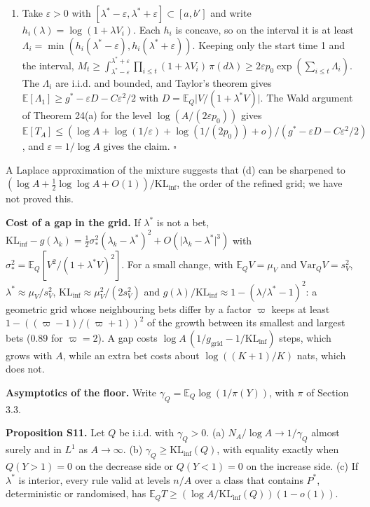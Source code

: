\documentclass[
]{article}
\begin{document}
\begin{enumerate}
  shows that \(K \asymp \sqrt{\log A}\) minimises the second-order term
  of this bound.
\item
  Take \(\varepsilon > 0\) with
  \([\lambda^\ast - \varepsilon, \lambda^\ast + \varepsilon] \subset [a, b']\)
  and write \(h_i(\lambda) = \log(1 + \lambda V_i)\). Each \(h_i\) is
  concave, so on the interval it is at least
  \(\Lambda_i = \min(h_i(\lambda^\ast - \varepsilon), h_i(\lambda^\ast + \varepsilon))\).
  Keeping only the start time 1 and the interval,
  \(M_t \ge \int_{\lambda^\ast - \varepsilon}^{\lambda^\ast + \varepsilon}\prod_{i \le t}(1 + \lambda V_i)\,\pi(d\lambda) \ge 2\varepsilon p_0\exp(\sum_{i \le t}\Lambda_i)\).
  The \(\Lambda_i\) are i.i.d. and bounded, and Taylor's theorem gives
  \(\mathbb{E}[\Lambda_1] \ge g^\ast - \varepsilon D - C\varepsilon^2/2\)
  with \(D = \mathbb{E}_Q\lvert V/(1 + \lambda^\ast V)\rvert\). The Wald
  argument of Theorem 24(a) for the level \(\log(A/(2\varepsilon p_0))\)
  gives
  \(\mathbb{E}[T_A] \le (\log A + \log(1/\varepsilon) + \log(1/(2p_0)) + o)/(g^\ast - \varepsilon D - C\varepsilon^2/2)\),
  and \(\varepsilon = 1/\log A\) gives the claim. \(\square\)
\end{enumerate}

A Laplace approximation of the mixture suggests that (d) can be
sharpened to
\((\log A + \tfrac12\log\log A + O(1))/\mathrm{KL}_{\inf}\), the order
of the refined grid; we have not proved this.

\textbf{Cost of a gap in the grid.} If \(\lambda^\ast\) is not a bet,
\(\mathrm{KL}_{\inf} - g(\lambda_k) = \tfrac12\sigma_\ast^2(\lambda_k - \lambda^\ast)^2 + O(\lvert \lambda_k - \lambda^\ast\rvert^3)\)
with \(\sigma_\ast^2 = \mathbb{E}_Q[V^2/(1 + \lambda^\ast V)^2]\). For a
small change, with \(\mathbb{E}_Q V = \mu_V\) and
\(\mathrm{Var}_Q V = s_V^2\), \(\lambda^\ast \approx \mu_V/s_V^2\),
\(\mathrm{KL}_{\inf} \approx \mu_V^2/(2s_V^2)\) and
\(g(\lambda)/\mathrm{KL}_{\inf} \approx 1 - (\lambda/\lambda^\ast - 1)^2\):
a geometric grid whose neighbouring bets differ by a factor \(\varpi\)
keeps at least \(1 - ((\varpi - 1)/(\varpi + 1))^2\) of the growth
between its smallest and largest bets (0.89 for \(\varpi = 2\)). A gap
costs \(\log A\,(1/g_{\mathrm{grid}} - 1/\mathrm{KL}_{\inf})\) steps,
which grows with \(A\), while an extra bet costs about \(\log((K+1)/K)\)
nats, which does not.

\textbf{Asymptotics of the floor.} Write
\(\gamma_Q = \mathbb{E}_Q\log(1/\pi(Y))\), with \(\pi\) of Section 3.3.

\textbf{Proposition S11.} Let \(Q\) be i.i.d. with \(\gamma_Q > 0\). (a)
\(N_A/\log A \to 1/\gamma_Q\) almost surely and in \(L^1\) as
\(A \to \infty\). (b) \(\gamma_Q \ge \mathrm{KL}_{\inf}(Q)\), with
equality exactly when \(Q(Y > 1) = 0\) on the decrease side or
\(Q(Y < 1) = 0\) on the increase side. (c) If \(\lambda^\ast\) is
interior, every rule valid at levels \(n/A\) over a class that contains
\(P^\ast\), deterministic or randomised, has
\(\mathbb{E}_Q T \ge (\log A/\mathrm{KL}_{\inf}(Q))(1 - o(1))\).
\end{document}

